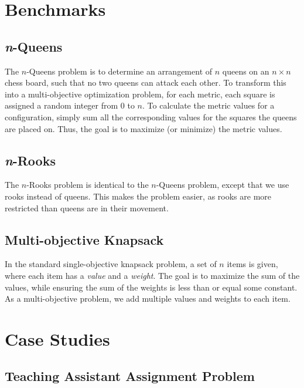 \documentclass[11pt]{article}
\begin{document}
\section{Benchmarks}\label{sec:benchmarks}

\subsection{\textit{n}-Queens}\label{sec:nqueens}

The $n$-Queens problem is to determine an arrangement of $n$
queens on an $n \times n$ chess board, such that no two queens can
attack each other. To transform this into a multi-objective
optimization problem, for each metric, each square is assigned a random
integer from $0$ to $n$. To calculate the metric values for a
configuration, simply sum all the corresponding values for the squares
the queens are placed on. Thus, the goal is to maximize (or minimize)
the metric values.

\subsection{\textit{n}-Rooks}\label{sec:nrooks}

The $n$-Rooks problem is identical to the $n$-Queens problem, except
that we use rooks instead of queens. This makes the problem easier, as
rooks are more restricted than queens are in their movement.

\subsection{Multi-objective Knapsack}\label{sec:knapsack}

In the standard single-objective knapsack problem, a set of $n$ items
is given, where each item has a \textit{value} and a \textit{weight}.
The goal is to maximize the sum of the values, while ensuring the sum
of the weights is less than or equal some constant. As a
multi-objective problem, we add multiple values and weights to each
item.

\section{Case Studies}\label{sec:case_studies}

\subsection{Teaching Assistant Assignment Problem}\label{sec:ta_problem}
\end{document}
